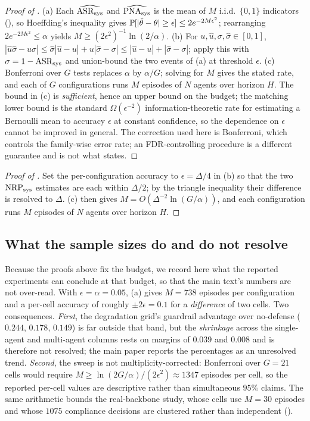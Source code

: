 \begin{proof}[Proof of ]
(a) Each $\widehat{\mathrm{ASR}_{\mathrm{sys}}}$ and $\widehat{\mathrm{PNA}_{\mathrm{sys}}}$ is the mean of $M$ i.i.d.\ $\{0,1\}$
indicators (), so Hoeffding's inequality gives
$\mathbb{P}[|\hat\theta-\theta|\ge\epsilon]\le2e^{-2M\epsilon^{2}}$; rearranging
$2e^{-2M\epsilon^{2}}\le\alpha$ yields $M\ge(2\epsilon^{2})^{-1}\ln(2/\alpha)$.
(b) For $u,\hat u,\sigma,\hat\sigma\in[0,1]$,
$|\hat u\hat\sigma-u\sigma|\le\hat\sigma|\hat u-u|+u|\hat\sigma-\sigma|
\le|\hat u-u|+|\hat\sigma-\sigma|$;
apply this with $\sigma=1-\mathrm{ASR}_{\mathrm{sys}}$ and union-bound the two events of (a) at threshold
$\epsilon$. (c) Bonferroni over $G$ tests replaces $\alpha$ by $\alpha/G$; solving for $M$
gives the stated rate, and each of $G$ configurations runs $M$ episodes of $N$ agents over
horizon $H$. The bound in (c) is \emph{sufficient}, hence an upper bound on the budget;
the matching lower bound is the standard $\Omega(\epsilon^{-2})$ information-theoretic rate
for estimating a Bernoulli mean to accuracy $\epsilon$ at constant confidence, so the
dependence on $\epsilon$ cannot be improved in general. The correction used here is
Bonferroni, which controls the family-wise error rate; an FDR-controlling procedure is a
different guarantee and is not what  states.
\end{proof}

\begin{proof}[Proof of ]
Set the per-configuration accuracy to $\epsilon=\Delta/4$ in (b) so that
the two $\mathrm{NRP}_{\mathrm{sys}}$ estimates are each within $\Delta/2$; by the triangle inequality their
difference is resolved to $\Delta$. (c) then gives
$M=O(\Delta^{-2}\ln(G/\alpha))$, and each configuration runs $M$ episodes of $N$ agents over
horizon $H$.
\end{proof}

\subsection{What the sample sizes do and do not resolve}
\label{app:main-power}

Because the proofs above fix the budget, we record here what the reported experiments can
conclude at that budget, so that the main text's numbers are not over-read. With
$\epsilon=\alpha=0.05$, (a) gives $M=738$ episodes per configuration and a
per-cell accuracy of roughly $\pm2\epsilon=0.1$ for a \emph{difference} of two cells. Two
consequences. \emph{First}, the degradation grid's guardrail advantage over no-defense
($0.244$, $0.178$, $0.149$) is far outside that band, but the \emph{shrinkage} across the
single-agent and multi-agent columns rests on margins of $0.039$ and $0.008$ and is therefore
not resolved; the main paper reports the percentages as an unresolved trend. \emph{Second},
the sweep is not multiplicity-corrected: Bonferroni over $G=21$ cells would require
$M\ge\ln(2G/\alpha)/(2\epsilon^{2})\approx1347$ episodes per cell, so the reported per-cell
values are descriptive rather than simultaneous $95\%$ claims. The same arithmetic bounds the
real-backbone study, whose cells use $M=30$ episodes and whose $1075$ compliance decisions
are clustered rather than independent ().
